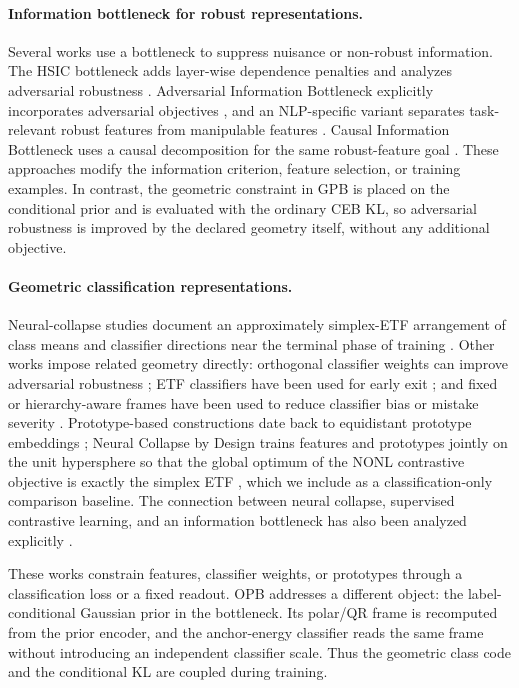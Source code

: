 \paragraph{Information bottleneck for robust representations.}
Several works use a bottleneck to suppress nuisance or non-robust information. The
HSIC bottleneck adds layer-wise dependence penalties and analyzes adversarial
robustness \citep{wang2021hsic}. Adversarial Information Bottleneck explicitly
incorporates adversarial objectives \citep{zhai2022adversarial}, and an NLP-specific
variant separates task-relevant robust features from manipulable features
\citep{zhang2022nl_ib}. Causal Information Bottleneck uses a causal decomposition
for the same robust-feature goal \citep{hua2022causal}. These approaches modify the
information criterion, feature selection, or training examples. In contrast, the
geometric constraint in GPB is placed on the conditional prior and is evaluated with
the ordinary CEB KL, so adversarial robustness is improved by the declared geometry
itself, without any additional objective.

\paragraph{Geometric classification representations.}
Neural-collapse studies document an approximately simplex-ETF arrangement of class
means and classifier directions near the terminal phase of training
\citep{papyan2020prevalence,zhu2021geometric_nc}. Other works impose related
geometry directly: orthogonal classifier weights can improve adversarial
robustness \citep{xu2022orthogonal}; ETF classifiers have been used for early exit
\citep{ji2023etf}; and fixed or hierarchy-aware frames have been used to reduce
classifier bias or mistake severity \citep{tong2023fixed_frame}. Prototype-based
constructions date back to equidistant prototype embeddings
\citep{deng2014equidistant}; Neural Collapse by Design trains features and
prototypes jointly on the unit hypersphere so that the global optimum of the NONL
contrastive objective is exactly the simplex ETF \citep{koromilas2026neural},
which we include as a classification-only comparison baseline. The connection
between neural collapse, supervised contrastive learning, and an information
bottleneck has also been analyzed explicitly \citep{wang2023ib_nc}.

These works constrain features, classifier weights, or prototypes through a
classification loss or a fixed readout. OPB addresses a different object: the
label-conditional Gaussian prior in the bottleneck. Its polar/QR frame is recomputed
from the prior encoder, and the anchor-energy classifier reads the same frame without
introducing an independent classifier scale. Thus the geometric class code and the
conditional KL are coupled during training.

